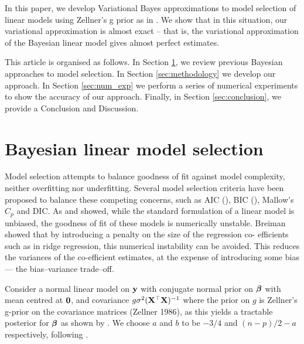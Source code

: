 \documentclass{amsart}[12pt]
\begin{document}


In this paper, we develop Variational Bayes approximations to model selection of linear models using Zellner's
g prior as in \cite{Liang2008}. We show that in this situation, our variational approximation is almost exact
-- that is, the variational approximation of the Bayesian linear model gives almost perfect estimates.


This article is organised as follows. In Section \ref{sec:model_selection}, we review previous Bayesian
approaches to model selection. In Section \ref{sec:methodology} we develop our approach. In Section
\ref{sec:num_exp} we perform a series of numerical experiments to show the accuracy of our approach. Finally,
in Section \ref{sec:conclusion}, we provide a Conclusion and Discussion.

\section{Bayesian linear model selection}
\label{sec:model_selection}

Model selection attempts to balance goodness of fit against model complexity, neither overfitting nor
underfitting. Several model selection criteria have been proposed to balance these competing concerns, such as
AIC (\cite{DeLeeuw1992}), BIC (\cite{Schwarz1978}), Mallow's $C_p$ and DIC. As \cite{Breiman1996} and
\cite{Efron2013} showed, while  the standard formulation of a linear model is unbiased, the goodness of fit of
these models is numerically  unstable. Breiman showed that by introducing a penalty on the size of the
regression co- efficients such as  in ridge regression, this numerical instability can be avoided. This reduces
the variances of the co-efficient estimates, at the expense of introducing some bias --- the bias--variance
trade--off.

Consider a normal linear model on ${\bf y}$ with conjugate normal prior on ${\boldsymbol \beta}$ with mean centred at ${\bf 0}$,
and covariance $g \sigma^2 ({\bf X}^\top {\bf X})^{-1}$ where the prior on $g$ is Zellner's g-prior on the covariance
matrices (Zellner 1986), as this yields a tractable posterior for ${\boldsymbol \beta}$ as shown by \cite{Liang2008}. We
choose $a$  and $b$ to be $-3/4$ and $(n - p)/2 - a$ respectively, following \cite{Maruyama2011}.
\end{document}
